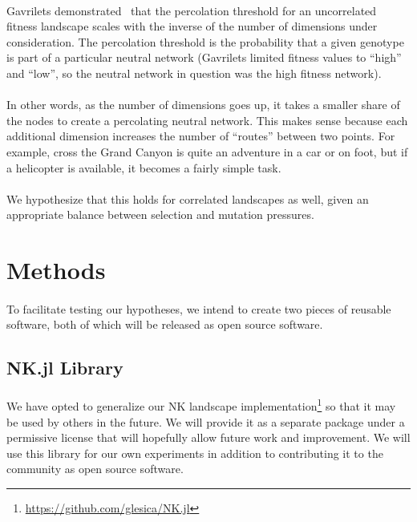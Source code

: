 \documentclass[12pt,letterpaper,titlepage,draft]{article}
\begin{document}
\paragraph{}
Gavrilets demonstrated~\cite{Gavrilets1997} that the percolation threshold for
an uncorrelated fitness landscape scales with the inverse of the number of
dimensions under consideration. The percolation threshold is the probability
that a given genotype is part of a particular neutral network (Gavrilets
limited fitness values to ``high'' and ``low'', so the neutral network in
question was the high fitness network).

\paragraph{}
In other words, as the number of dimensions goes up, it takes a smaller share
of the nodes to create a percolating neutral network. This makes sense because
each additional dimension increases the number of ``routes'' between two
points. For example, cross the Grand Canyon is quite an adventure in a car or
on foot, but if a helicopter is available, it becomes a fairly simple task.

\paragraph{}
We hypothesize that this holds for correlated landscapes as well, given an
appropriate balance between selection and mutation pressures.

\section{Methods}

\paragraph{}
To facilitate testing our hypotheses, we intend to create two pieces of
reusable software, both of which will be released as open source software.

\subsection{NK.jl Library}

\paragraph{}
We have opted to generalize our NK landscape
implementation\footnote{\url{https://github.com/glesica/NK.jl}} so that it may
be used by others in the future. We will provide it as a separate package under
a permissive license that will hopefully allow future work and improvement.  We
will use this library for our own experiments in addition to contributing it to
the community as open source software.
\end{document}
